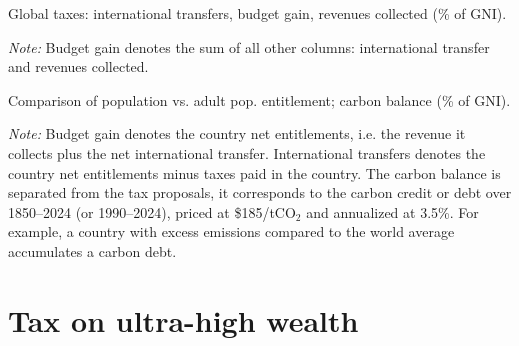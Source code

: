 \documentclass[12pt,english]{article}
\begin{document}
\clearpage
\begin{table}[!h]
  \caption{\label{tab:transfers_gain}Global taxes: international transfers, budget gain, revenues collected (\% of GNI). }
  \makebox[\textwidth][c]{
} 
{\footnotesize \textit{Note:}  Budget gain denotes the sum of all other columns: international transfer and revenues collected. %
}
\end{table}
\clearpage

\begin{table}[!h]
  \vspace{-1cm}
  \caption{\label{tab:transfers_balance}Comparison of population vs. adult pop. entitlement; carbon balance (\% of GNI). }
  \makebox[\textwidth][c]{
} 
{\footnotesize \textit{Note:} Budget gain denotes the country net entitlements, i.e. the revenue it collects plus the net international transfer. International transfers denotes the country net entitlements minus taxes paid in the country. The carbon balance is separated from the tax proposals, it corresponds to the carbon credit or debt over 1850--2024 (or 1990--2024), priced at \$185/tCO$_\text{2}$ and annualized at 3.5\%. For example, a country with excess emissions compared to the world average accumulates a carbon debt. %
}
\end{table}
\clearpage


\section{Tax on ultra-high wealth}\label{sec:wealth}

\end{document}
